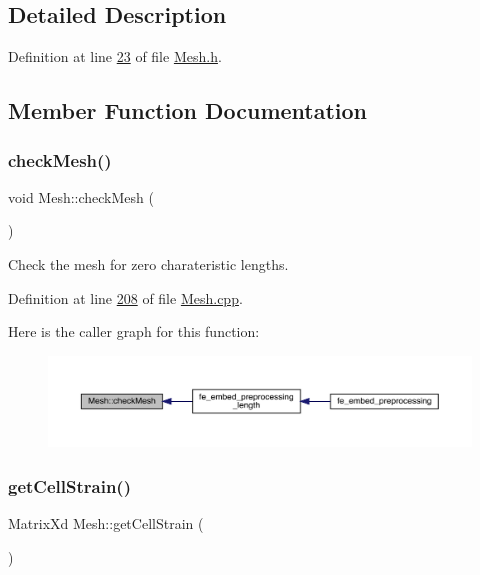 \subsection{Detailed Description}


Definition at line \hyperlink{_mesh_8h_source_l00023}{23} of file \hyperlink{_mesh_8h_source}{Mesh.\+h}.



\subsection{Member Function Documentation}
\mbox{\label{class_mesh_a894e41dd4280dfba75406eb8d0338a8e}} 
\subsubsection{\texorpdfstring{check\+Mesh()}{checkMesh()}}
{\footnotesize\ttfamily void Mesh\+::check\+Mesh (\begin{DoxyParamCaption}{ }\end{DoxyParamCaption})}



Check the mesh for zero charateristic lengths. 



Definition at line \hyperlink{_mesh_8cpp_source_l00208}{208} of file \hyperlink{_mesh_8cpp_source}{Mesh.\+cpp}.

Here is the caller graph for this function\+:\nopagebreak
\begin{figure}[H]
\begin{center}
\leavevmode
\includegraphics[width=350pt]{class_mesh_a894e41dd4280dfba75406eb8d0338a8e_icgraph}
\end{center}
\end{figure}
\mbox{\label{class_mesh_a1c54802401d00d14b390db2f0e615ebb}} 
\subsubsection{\texorpdfstring{get\+Cell\+Strain()}{getCellStrain()}}
{\footnotesize\ttfamily Matrix\+Xd Mesh\+::get\+Cell\+Strain (\begin{DoxyParamCaption}{ }\end{DoxyParamCaption})}

